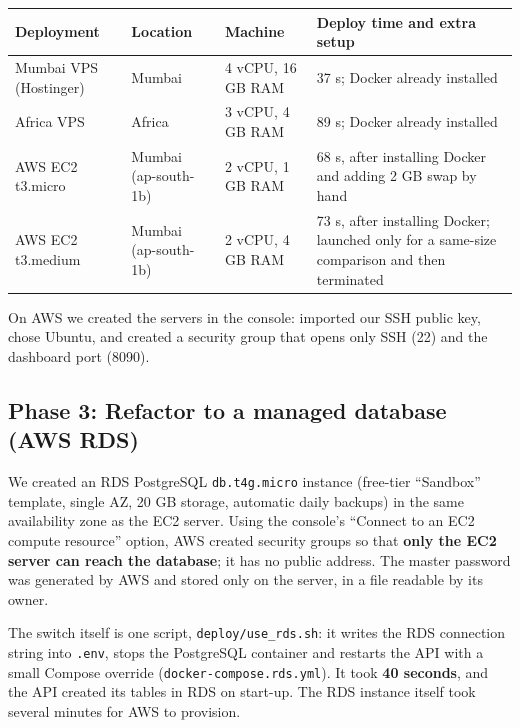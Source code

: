 \documentclass[12pt,a4paper]{article}
\begin{document}
\begin{center}
\begin{tabularx}{\linewidth}{@{}p{3.6cm}p{2.3cm}p{3.6cm}L@{}}
\toprule
\textbf{Deployment} & \textbf{Location} & \textbf{Machine} & \textbf{Deploy time and extra setup} \\
\midrule
Mumbai VPS (Hostinger) & Mumbai & 4 vCPU, 16 GB RAM & 37 s; Docker already installed \\
Africa VPS & Africa & 3 vCPU, 4 GB RAM & 89 s; Docker already installed \\
AWS EC2 t3.micro & Mumbai (ap-south-1b) & 2 vCPU, 1 GB RAM & 68 s, after installing Docker and adding 2 GB swap by hand \\
AWS EC2 t3.medium & Mumbai (ap-south-1b) & 2 vCPU, 4 GB RAM & 73 s, after installing Docker; launched only for a same-size comparison and then terminated \\
\bottomrule
\end{tabularx}
\end{center}

On AWS we created the servers in the console: imported our SSH public key, chose Ubuntu, and created a
security group that opens only SSH (22) and the dashboard port (8090).

\subsection{Phase 3: Refactor to a managed database (AWS RDS)}
We created an RDS PostgreSQL \texttt{db.t4g.micro} instance (free-tier ``Sandbox'' template, single AZ,
20 GB storage, automatic daily backups) in the same availability zone as the EC2 server. Using the
console's ``Connect to an EC2 compute resource'' option, AWS created security groups so that
\textbf{only the EC2 server can reach the database}; it has no public address. The master password was
generated by AWS and stored only on the server, in a file readable by its owner.

The switch itself is one script, \texttt{deploy/use\_rds.sh}: it writes the RDS connection string into
\texttt{.env}, stops the PostgreSQL container and restarts the API with a small Compose override
(\texttt{docker-compose.rds.yml}). It took \textbf{40 seconds}, and the API created its tables in RDS on
start-up. The RDS instance itself took several minutes for AWS to provision.
\end{document}
